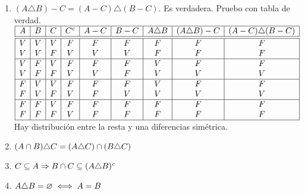 \begin{enumerate}[label=\roman*)]
	\item $(A \triangle B) - C = (A-C) \triangle (B - C)$. Es verdadera. Pruebo con tabla de verdad.\\
	      $
		      \begin{array}{|c|c|c|c|c|c|c|c|c|}
			      \hline
			      A & B & C & C^c & A - C & B - C & A \triangle B & (A \triangle B) - C & (A - C) \triangle (B - C) \\
			      \hline  \hline
			      V & V & V & F   & F     & F     & F             & F                   & F                         \\
			      V & V & F & V   & V     & V     & F             & F                   & F                         \\
			      \hline
			      V & F & V & F   & F     & F     & V             & F                   & F                         \\
			      V & F & F & V   & V     & F     & V             & V                   & V                         \\
			      \hline
			      F & V & V & F   & F     & F     & V             & F                   & F                         \\
			      F & V & F & V   & F     & V     & V             & V                   & V                         \\
			      \hline
			      F & F & V & F   & F     & F     & F             & F                   & F                         \\
			      F & F & F & V   & F     & F     & F             & F                   & F                         \\
			      \hline
		      \end{array}
	      $\\
	      Hay distribución entre la resta y una diferencias simétrica.

	\item $(A \cap B) \triangle C = (A \triangle C) \cap (B \triangle C)$
	\item $C \subseteq A \Rightarrow B \cap C \subseteq (A \triangle B)^c$
	\item $A \triangle B = \varnothing \iff A = B$
\end{enumerate}


